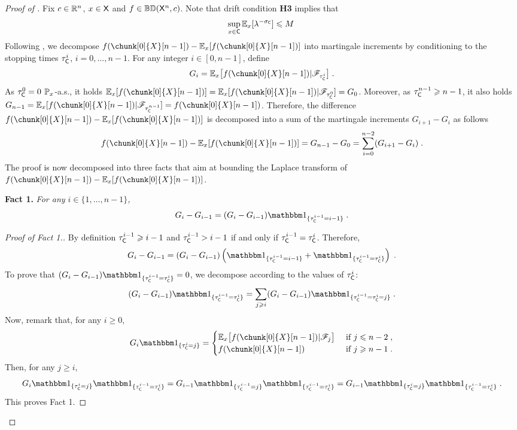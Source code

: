 \documentclass[leqno,11pt,a4paper]{article}
\begin{document}
\begin{proof}[Proof of ]
Fix $c\in \mathbb{R}^n$, $x\in\mathsf{X}$ and $f\in \mathbb{BD}(\mathsf{X}^n,c)$. Note that drift condition {\bf H3} implies that
\[
\sup_{x\in \mathsf{C}}\mathbb{E}_x[\lambda^{-\sigma_{\mathsf{C}}}]\leqslant M\;
\]
Following \cite{MR3407208}, we decompose $f(\chunk[0]{X}[n-1])-\Ebb_x[f(\chunk[0]{X}[n-1])]$ into martingale increments by conditioning to the stopping times $\tau_{\mathsf{C}}^i$, $i=0,\ldots, n-1$.
For any integer $i\in [0,n-1]$, define
\[
G_i=\Ebb_x\big[f(\chunk[0]{X}[n-1])|\cF_{\tau_{\cC}^i}\big]\eqsp.
\]
As $\tau_{\mathsf{C}}^0=0$ $\mathbb{P}_x$-a.s., it holds $\Ebb_x[f(\chunk[0]{X}[n-1])]=\Ebb_x[f(\chunk[0]{X}[n-1])|\cF_{\tau_{\cC}^0}]=G_0$.
Moreover, as $\tau_{\mathsf{C}}^{n-1}\geqslant n-1$, it also holds $G_{n-1}=\Ebb_x[f(\chunk[0]{X}[n-1])|\cF_{\tau_{\cC}^{n-1}}]=f(\chunk[0]{X}[n-1])$.
Therefore, the difference $f(\chunk[0]{X}[n-1])-\Ebb_x[f(\chunk[0]{X}[n-1])]$ is decomposed into a sum of the martingale increments $G_{i+1}-G_i$ as follows
\begin{equation}\label{eq:LinkWithG}
 f(\chunk[0]{X}[n-1])-\Ebb_x[f(\chunk[0]{X}[n-1])]=G_{n-1}-G_0=\sum_{i=0}^{n-2}(G_{i+1}-G_i)\eqsp.
\end{equation}
The proof is now decomposed into three facts that aim at bounding the Laplace transform of $f(\chunk[0]{X}[n-1])-\Ebb_x[f(\chunk[0]{X}[n-1])]$.

\noindent
{\bf Fact 1.} \emph{For any $i\in \{1,\ldots,n-1\}$,}
\begin{equation}\label{eq:Fact1}
 G_i-G_{i-1}=(G_i-G_{i-1})\indiacc{\tau_{\cC}^{i-1}=i-1}\eqsp.
\end{equation}
\begin{proof}[Proof of Fact 1.] By definition $\tau_{\mathsf{C}}^{i-1}\geqslant i-1$ and $\tau_{\mathsf{C}}^{i-1}> i-1$ if and only if $\tau_{\mathsf{C}}^{i-1}=\tau_{\mathsf{C}}^{i}$.
 Therefore,
 \[
 G_i-G_{i-1}=(G_i-G_{i-1})\left(\indiacc{\tau_{\cC}^{i-1}=i-1}+\indiacc{\tau_{\cC}^{i-1}=\tau_{\cC}^{i}}\right)\eqsp.
 \]
To prove that $(G_i-G_{i-1})\indiacc{\tau_{\cC}^{i-1}=\tau_{\cC}^{i}}=0$, we decompose according to the values of $\tau_{\mathsf{C}}^{i}$:
 \[
(G_i-G_{i-1})\indiacc{\tau_{\cC}^{i-1}=\tau_{\cC}^{i}}=\sum_{j\geqslant i} (G_i-G_{i-1})\indiacc{\tau_{\cC}^{i-1}=\tau_{\cC}^{i}=j}\eqsp.
 \]
Now, remark that, for any $i\geqslant 0$,
\begin{align}
 G_i\indiacc{\tau_{\cC}^{i}=j}=
\begin{cases}\label{eq:Gitaui=j}
 \Ebb_x\big[f(\chunk[0]{X}[n-1])|\cF_j\big]&\text{ if } j\leqslant n-2\eqsp,\\
 f(\chunk[0]{X}[n-1])&\text{ if } j\geqslant n-1\eqsp.
\end{cases}
\end{align}
Then, for any $j\geqslant i$,
\[
 G_i\indiacc{\tau_{\cC}^{i}=j}\indiacc{\tau_{\cC}^{i-1}=\tau_{\cC}^{i}}= G_{i-1}\indiacc{\tau_{\cC}^{i-1}=j}\indiacc{\tau_{\cC}^{i-1}=\tau_{\cC}^{i}}=G_{i-1}\indiacc{\tau_{\cC}^{i}=j}\indiacc{\tau_{\cC}^{i-1}=\tau_{\cC}^{i}}\eqsp.
\]
This proves Fact 1.
\end{proof}


\end{proof}
\end{document}
